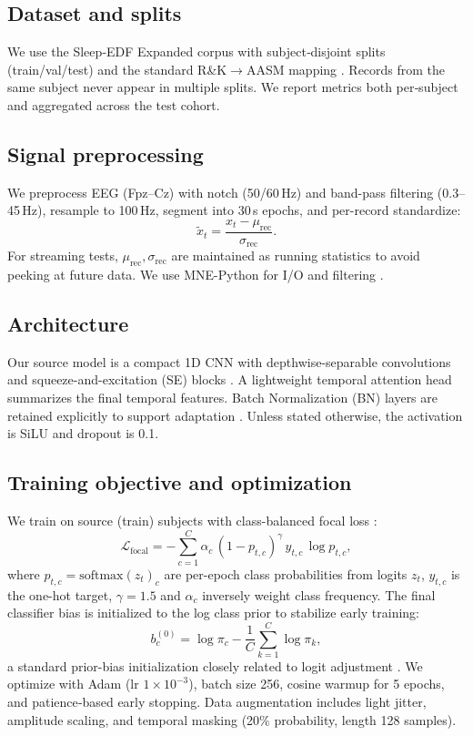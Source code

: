 \documentclass{article}
\begin{document}
\subsection{Dataset and splits}
We use the Sleep‐EDF Expanded corpus with subject‐disjoint splits (train/val/test) and the standard R\&K$\to$AASM mapping \citep{kemp2000sleepedf,goldberger2000physionet,Iber2007AASM}. Records from the same subject never appear in multiple splits. We report metrics both per‐subject and aggregated across the test cohort.

\subsection{Signal preprocessing}
We preprocess EEG (Fpz–Cz) with notch (50/60\,Hz) and band-pass filtering (0.3–45\,Hz), resample to 100\,Hz, segment into 30\,s epochs, and per-record standardize:
\[
\tilde{x}_t = \frac{x_t - \mu_{\text{rec}}}{\sigma_{\text{rec}}}.
\]
For streaming tests, $\mu_{\text{rec}},\sigma_{\text{rec}}$ are maintained as running statistics to avoid peeking at future data. We use MNE-Python for I/O and filtering \citep{gramfort2013mne,gramfort2014mne}.

\subsection{Architecture}
Our source model is a compact 1D CNN with depthwise-separable convolutions and squeeze-and-excitation (SE) blocks \citep{howard2017mobilenets,hu2018squeeze}. A lightweight temporal attention head summarizes the final temporal features. Batch Normalization (BN) layers are retained explicitly to support adaptation \citep{ioffe2015batch}. Unless stated otherwise, the activation is SiLU and dropout is 0.1.

\subsection{Training objective and optimization}
We train on source (train) subjects with class-balanced focal loss \citep{lin2017focal}:
\[
\mathcal{L}_{\text{focal}} = -\sum_{c=1}^{C} \alpha_c \,(1-p_{t,c})^{\gamma}\, y_{t,c}\,\log p_{t,c},
\]
where $p_{t,c}=\mathrm{softmax}(z_t)_c$ are per-epoch class probabilities from logits $z_t$, $y_{t,c}$ is the one-hot target, $\gamma{=}1.5$ and $\alpha_c$ inversely weight class frequency. The final classifier bias is initialized to the log class prior to stabilize early training:
\[
b_c^{(0)} = \log \pi_c - \frac{1}{C}\sum_{k=1}^{C}\log \pi_k,
\]
a standard prior-bias initialization closely related to logit adjustment \citep{menon2020longtail}. We optimize with Adam (lr $1\times 10^{-3}$), batch size 256, cosine warmup for 5 epochs, and patience‐based early stopping. Data augmentation includes light jitter, amplitude scaling, and temporal masking (20\% probability, length 128 samples).
\end{document}
